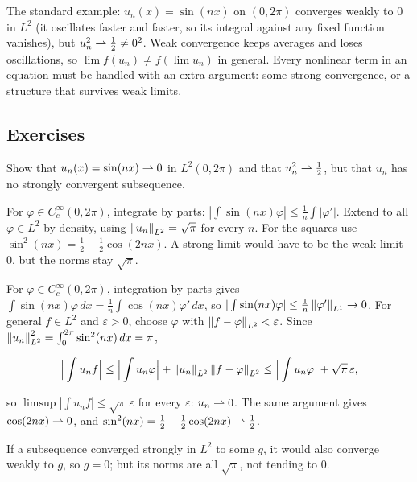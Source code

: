 The standard example: $u_n(x) = \sin(nx)$ on $(0,2\pi)$ converges weakly to $0$ in $L^2$ (it oscillates faster and faster, so its integral against any fixed function vanishes), but $u_n^2 \rightharpoonup \frac12 \ne 0^2$. Weak convergence keeps averages and loses oscillations, so $\lim f(u_n) \ne f(\lim u_n)$ in general. Every nonlinear term in an equation must be handled with an extra argument: some strong convergence, or a structure that survives weak limits.

\subsection*{Exercises}

\begin{exercise}
  Show that $u_n(x) = \sin(nx) \rightharpoonup 0$ in $L^2(0,2\pi)$ and that $u_n^2 \rightharpoonup \frac12$, but that $u_n$ has no strongly convergent subsequence.
  \begin{hint}
    For $\varphi \in C_c^\infty(0,2\pi)$, integrate by parts: $|\int \sin(nx)\varphi| \le \frac1n\int|\varphi'|$. Extend to all $\varphi \in L^2$ by density, using $\left\lVert u_n\right\rVert_{L^2} = \sqrt\pi$ for every $n$. For the squares use $\sin^2(nx) = \frac12 - \frac12\cos(2nx)$. A strong limit would have to be the weak limit $0$, but the norms stay $\sqrt\pi$.
  \end{hint}
  \begin{solution}
    For $\varphi \in C_c^\infty(0,2\pi)$, integration by parts gives $\int \sin(nx)\varphi\,dx = \frac1n\int\cos(nx)\varphi'\,dx$, so $|\int\sin(nx)\varphi| \le \frac1n\left\lVert \varphi'\right\rVert_{L^1} \to 0$. For general $f \in L^2$ and $\varepsilon > 0$, choose $\varphi$ with $\left\lVert f - \varphi\right\rVert_{L^2} < \varepsilon$. Since $\left\lVert u_n\right\rVert_{L^2}^2 = \int_0^{2\pi}\sin^2(nx)\,dx = \pi$,

    \[ \Big|\int u_n f\Big| \le \Big|\int u_n\varphi\Big| + \left\lVert u_n\right\rVert_{L^2}\left\lVert f - \varphi\right\rVert_{L^2} \le \Big|\int u_n\varphi\Big| + \sqrt\pi\,\varepsilon, \]

    so $\limsup|\int u_nf| \le \sqrt\pi\,\varepsilon$ for every $\varepsilon$: $u_n \rightharpoonup 0$. The same argument gives $\cos(2nx) \rightharpoonup 0$, and $\sin^2(nx) = \frac12 - \frac12\cos(2nx) \rightharpoonup \frac12$.

    If a subsequence converged strongly in $L^2$ to some $g$, it would also converge weakly to $g$, so $g = 0$; but its norms are all $\sqrt\pi$, not tending to $0$.
  \end{solution}
\end{exercise}

